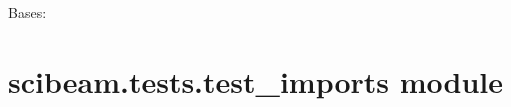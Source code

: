 \documentclass[letterpaper,10pt,english]{sphinxmanual}
\begin{document}
\begin{fulllineitems}
\label{\detokenize{scibeam.tests:scibeam.tests.test_formatter.TestFunctions}}
Bases: 

\begin{fulllineitems}
\label{\detokenize{scibeam.tests:scibeam.tests.test_formatter.TestFunctions.testDict}}
\end{fulllineitems}


\begin{fulllineitems}
\label{\detokenize{scibeam.tests:scibeam.tests.test_formatter.TestFunctions.test_formart_dict}}
\end{fulllineitems}


\end{fulllineitems}



\section{scibeam.tests.test\_imports module}
\label{\detokenize{scibeam.tests:module-scibeam.tests.test_imports}}\label{\detokenize{scibeam.tests:scibeam-tests-test-imports-module}}
\end{document}
